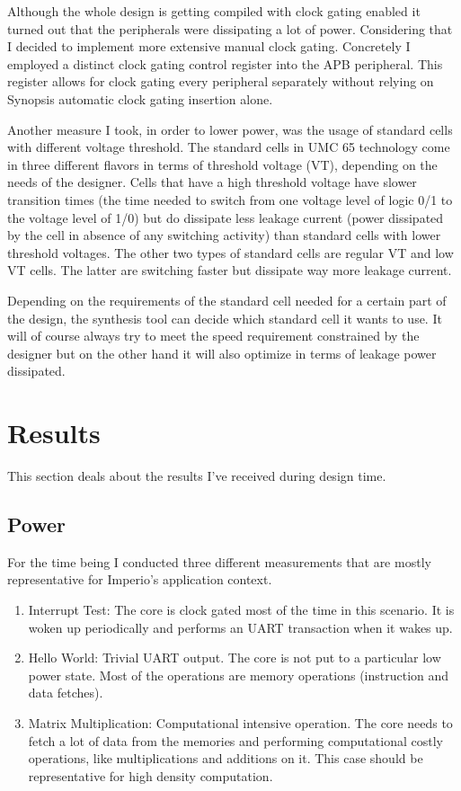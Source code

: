Although the whole design is getting compiled with clock gating enabled it turned out that the peripherals were dissipating a lot of power. Considering that I decided to implement more extensive manual clock gating. Concretely I employed a distinct clock gating control register into the APB \pulpino peripheral. This register allows for clock gating every peripheral separately without relying on Synopsis automatic clock gating insertion alone.

Another measure I took, in order to lower power, was the usage of standard cells with different voltage threshold. The standard cells in UMC 65 technology come in three different flavors in terms of threshold voltage (VT), depending on the needs of the designer. Cells that have a high threshold voltage have slower transition times (the time needed to switch from one voltage level of logic 0/1 to the voltage level of 1/0) but do dissipate less leakage current (power dissipated by the cell in absence of any switching activity) than standard cells with lower threshold voltages. The other two types of standard cells are regular VT and low VT cells. The latter are switching faster but dissipate way more leakage current.

Depending on the requirements of the standard cell needed for a certain part of the design, the synthesis tool can decide which standard cell it wants to use. It will of course always try to meet the speed requirement constrained by the designer but on the other hand it will also optimize in terms of leakage power dissipated.

\section{Results}

This section deals about the results I've received during design time.

\subsection{Power}

For the time being I conducted three different measurements that are mostly representative for Imperio's application context.

\begin{enumerate}
    \item Interrupt Test: The core is clock gated most of the time in this scenario. It is woken up periodically and performs an UART transaction when it wakes up.
    \item Hello World: Trivial UART output. The core is not put to a particular low power state. Most of the operations are memory operations (instruction and data fetches).
    \item Matrix Multiplication: Computational intensive operation. The core needs to fetch a lot of data from the memories and performing computational costly operations, like multiplications and additions on it. This case should be representative for high density computation. 
\end{enumerate}

